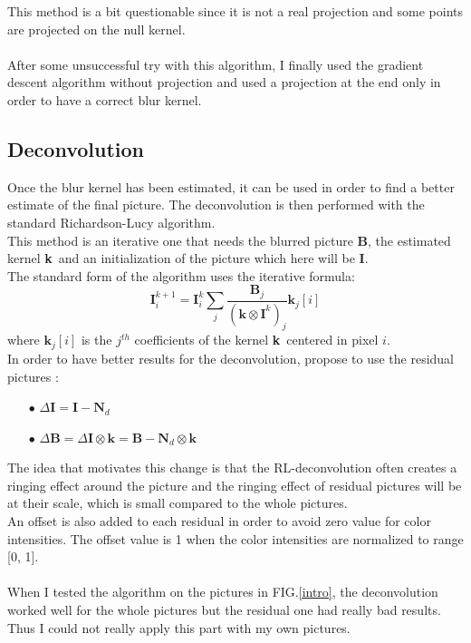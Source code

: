 \documentclass{article}
\newcommand{\I}{\textbf{I}}
\newcommand{\B}{\textbf{B}}
\newcommand{\Nd}{\textbf{N$_d$}}
\newcommand{\kernel}{\textbf{k}}
\begin{document}
This method is a bit questionable since it is not a real projection and some points are projected on the null kernel.\\
\\
After some unsuccessful try with this algorithm, I finally used the gradient descent algorithm without projection and used a projection at the end only in order to have a correct blur kernel.

\subsection{Deconvolution}

Once the blur kernel has been estimated, it can be used in order to find a better estimate of the final picture. The deconvolution is then performed with the standard Richardson-Lucy algorithm.\\
This method is an iterative one that needs the blurred picture \B, the estimated kernel \kernel\ and an initialization of the picture which here will be \I.\\
The standard form of the algorithm uses the iterative formula:
\[
	\I^{k+1} _i= \I^k_i \sum_{j}\frac{\B_j}{(\kernel \otimes \I^k)_j} \kernel_j[i]
\]
where $\kernel_j[i]$ is the $j^{th}$ coefficients of the kernel \kernel\ centered in pixel $i$.\\

In order to have better results for the deconvolution, \cite{deblur_denoise} propose to use the residual pictures :
\begin{itemize}
	\item[$\bullet$] $\Delta \I = \I - \Nd$
	\item[$\bullet$] $\Delta \B = \Delta \I \otimes \kernel = \B - \Nd \otimes \kernel$
\end{itemize}

The idea that motivates this change is that the RL-deconvolution often creates a ringing effect around the picture and the ringing effect of residual pictures will be at their scale, which is small compared to the whole pictures.\\
An offset is also added to each residual in order to avoid zero value for color intensities. The offset value is 1 when the color intensities are normalized to range [0, 1].\\
\\
When I tested the algorithm on the pictures in FIG.\ref{intro}, the deconvolution worked well for the whole pictures but the residual one had really bad results. Thus I could not really apply this part with my own pictures.
\end{document}
